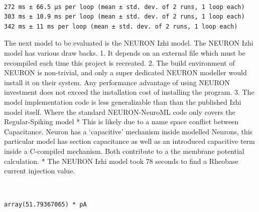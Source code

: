     \begin{center}
    \end{center}
    { \hspace*{\fill} \\}
    

    
    
    \begin{center}
    \end{center}
    
    \begin{Verbatim}[commandchars=\\\{\}]
272 ms ± 66.5 µs per loop (mean ± std. dev. of 2 runs, 1 loop each)
303 ms ± 10.9 ms per loop (mean ± std. dev. of 2 runs, 1 loop each)
342 ms ± 11 ms per loop (mean ± std. dev. of 2 runs, 1 loop each)
    \end{Verbatim}

    The next model to be evaluated is the NEURON Izhi model. The NEURON Izhi
model has various draw backs. 1. It depends on an external file which
must be recompiled each time this project is recreated. 2. The build
environment of NEURON is non-trivial, and only a super dedicated NEURON
modeller would install it on their system. Any performance advantage of
using NEURON investment does not exceed the installation cost of
installing the program. 3. The model implementation code is less
generalizable than than the published Izhi model itself. Where the
standard NEURON-NeuroML code only covers the Regular-Spiking model *
This is likely due to a name space conflict between Capacitance. Neuron
has a `capacitive' mechanism inside modelled Neurons, this particular
model has section capacitance as well as an introduced capacitive term
inside a C-compiled mechanism. Both contribute to a the membrane
potential calculation. * The NEURON Izhi model took 78 seconds to find a
Rheobase current injection value.
    
    \begin{center}
    \end{center}
    { \hspace*{\fill} \\}
    

\begin{Verbatim}[commandchars=\\\{\}]
array(51.79367065) * pA
\end{Verbatim}
        


